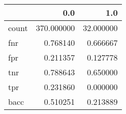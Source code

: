 \begin{tabular}{lrr}
\toprule
{} &         0.0 &        1.0 \\
\midrule
count &  370.000000 &  32.000000 \\
fnr   &    0.768140 &   0.666667 \\
fpr   &    0.211357 &   0.127778 \\
tnr   &    0.788643 &   0.650000 \\
tpr   &    0.231860 &   0.000000 \\
bacc  &    0.510251 &   0.213889 \\
\bottomrule
\end{tabular}
